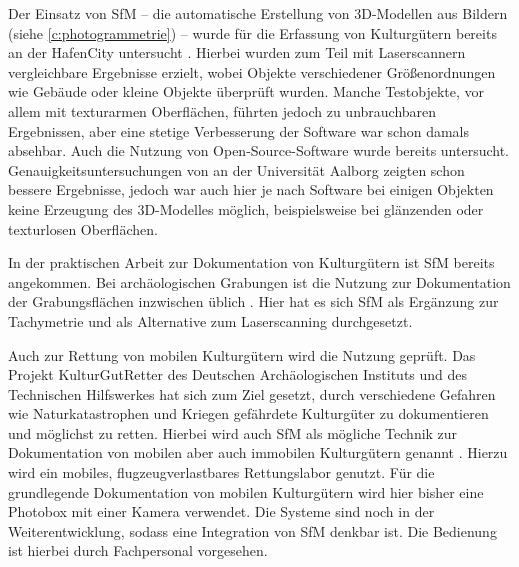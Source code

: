 \documentclass[./00PhotoBox]{subfiles}
\begin{document}
Der Einsatz von \acrfull{SfM} -- die au\-to\-ma\-tische Erstellung von 3D-Modellen aus Bildern (siehe \autoref{c:photogrammetrie}) -- wurde für die Erfassung von Kulturgütern bereits \citeyear{kersten2012} an der HafenCity untersucht \citep[vgl.][]{kersten2012}. Hierbei wurden zum Teil mit Laserscannern vergleichbare Ergebnisse erzielt, wobei Objekte verschiedener Größenordnungen wie Gebäude oder kleine Objekte überprüft wurden. Manche Testobjekte, vor allem mit texturarmen Oberflächen, führten jedoch zu unbrauchbaren Ergebnissen, aber eine stetige Verbesserung der Software war schon damals absehbar. Auch die Nutzung von Open-Source-Software wurde bereits untersucht. Genauigkeitsuntersuchungen von \citet{IvanNikolov} an der Universität Aalborg zeigten schon bessere Ergebnisse, jedoch war auch hier je nach Software bei einigen Objekten keine Erzeugung des 3D-Modelles möglich, beispielsweise bei glänzenden oder texturlosen Oberflächen.

In der praktischen Arbeit zur Dokumentation von Kulturgütern ist \acrfull{SfM} bereits angekommen. Bei archäologischen Grabungen ist die Nutzung zur Dokumentation der Grabungsflächen inzwischen üblich \citep[vgl.][]{grabungen_sfm}. Hier hat es sich \Gls{SfM} als Ergänzung zur Tachymetrie und als Alternative zum Laserscanning durchgesetzt.

Auch zur Rettung von mobilen Kulturgütern wird die Nutzung geprüft. Das Projekt KulturGutRetter des Deutschen Archäologischen Instituts und des Technischen Hilfswerkes hat sich zum Ziel gesetzt, durch verschiedene Gefahren wie Naturkatastrophen und Kriegen gefährdete Kulturgüter zu dokumentieren und möglichst zu retten. Hierbei wird auch \Gls{SfM} als mögliche Technik zur Dokumentation von mobilen aber auch immobilen Kulturgütern genannt \citep[vgl.][S. 48]{kgr_article}. Hierzu wird ein mobiles, flugzeugverlastbares  Rettungslabor genutzt. Für die grundlegende Dokumentation von mobilen Kulturgütern wird hier bisher eine Photobox mit einer Kamera verwendet. Die Systeme sind noch in der Weiterentwicklung, sodass eine Integration von \Gls{SfM} denkbar ist. Die Bedienung ist hierbei durch Fachpersonal vorgesehen. \citep[vgl.][]{kulturgutretter}

\biblio
\end{document}
